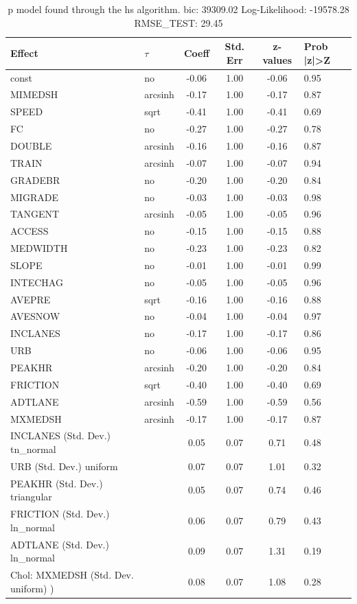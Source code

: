 \begin{table}
	\caption{p model found through the hs algorithm. bic: 39309.02 Log-Likelihood: -19578.28 RMSE_TEST: 29.45}
	\begin{center}
		\begin{tabular}{|l|l|c|c|c|l|}
			\hline
			Effect & $\tau$ & Coeff & Std. Err & z-values & Prob |z|>Z \\
			\hline
			const & no & -0.06 & 1.00 & -0.06 & 0.95 \\
			\hline
			MIMEDSH & arcsinh & -0.17 & 1.00 & -0.17 & 0.87 \\
			\hline
			SPEED & sqrt & -0.41 & 1.00 & -0.41 & 0.69 \\
			\hline
			FC & no & -0.27 & 1.00 & -0.27 & 0.78 \\
			\hline
			DOUBLE & arcsinh & -0.16 & 1.00 & -0.16 & 0.87 \\
			\hline
			TRAIN & arcsinh & -0.07 & 1.00 & -0.07 & 0.94 \\
			\hline
			GRADEBR & no & -0.20 & 1.00 & -0.20 & 0.84 \\
			\hline
			MIGRADE & no & -0.03 & 1.00 & -0.03 & 0.98 \\
			\hline
			TANGENT & arcsinh & -0.05 & 1.00 & -0.05 & 0.96 \\
			\hline
			ACCESS & no & -0.15 & 1.00 & -0.15 & 0.88 \\
			\hline
			MEDWIDTH & no & -0.23 & 1.00 & -0.23 & 0.82 \\
			\hline
			SLOPE & no & -0.01 & 1.00 & -0.01 & 0.99 \\
			\hline
			INTECHAG & no & -0.05 & 1.00 & -0.05 & 0.96 \\
			\hline
			AVEPRE & sqrt & -0.16 & 1.00 & -0.16 & 0.88 \\
			\hline
			AVESNOW & no & -0.04 & 1.00 & -0.04 & 0.97 \\
			\hline
			INCLANES & no & -0.17 & 1.00 & -0.17 & 0.86 \\
			\hline
			URB & no & -0.06 & 1.00 & -0.06 & 0.95 \\
			\hline
			PEAKHR & arcsinh & -0.20 & 1.00 & -0.20 & 0.84 \\
			\hline
			FRICTION & sqrt & -0.40 & 1.00 & -0.40 & 0.69 \\
			\hline
			ADTLANE & arcsinh & -0.59 & 1.00 & -0.59 & 0.56 \\
			\hline
			MXMEDSH & arcsinh & -0.17 & 1.00 & -0.17 & 0.87 \\
			\hline
			INCLANES (Std. Dev.) tn_normal &  & 0.05 & 0.07 & 0.71 & 0.48 \\
			\hline
			URB (Std. Dev.) uniform &  & 0.07 & 0.07 & 1.01 & 0.32 \\
			\hline
			PEAKHR (Std. Dev.) triangular &  & 0.05 & 0.07 & 0.74 & 0.46 \\
			\hline
			FRICTION (Std. Dev.) ln_normal &  & 0.06 & 0.07 & 0.79 & 0.43 \\
			\hline
			ADTLANE (Std. Dev.) ln_normal &  & 0.09 & 0.07 & 1.31 & 0.19 \\
			\hline
			 Chol: MXMEDSH (Std. Dev. uniform) ) &  & 0.08 & 0.07 & 1.08 & 0.28 \\
			\hline
		\end{tabular}
	\end{center}
\end{table}
